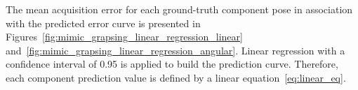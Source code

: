 The mean acquisition error for each ground-truth component pose in association with the predicted error curve is presented in Figures~\ref{fig:mimic_grapsing_linear_regression_linear} and~\ref{fig:mimic_grapsing_linear_regression_angular}.
Linear regression  with a confidence interval of 0.95 is applied to build the prediction curve. Therefore, each component prediction value is defined by a linear equation~\ref{eq:linear_eq}.

\begin{figure}[h!]
\end{figure}
